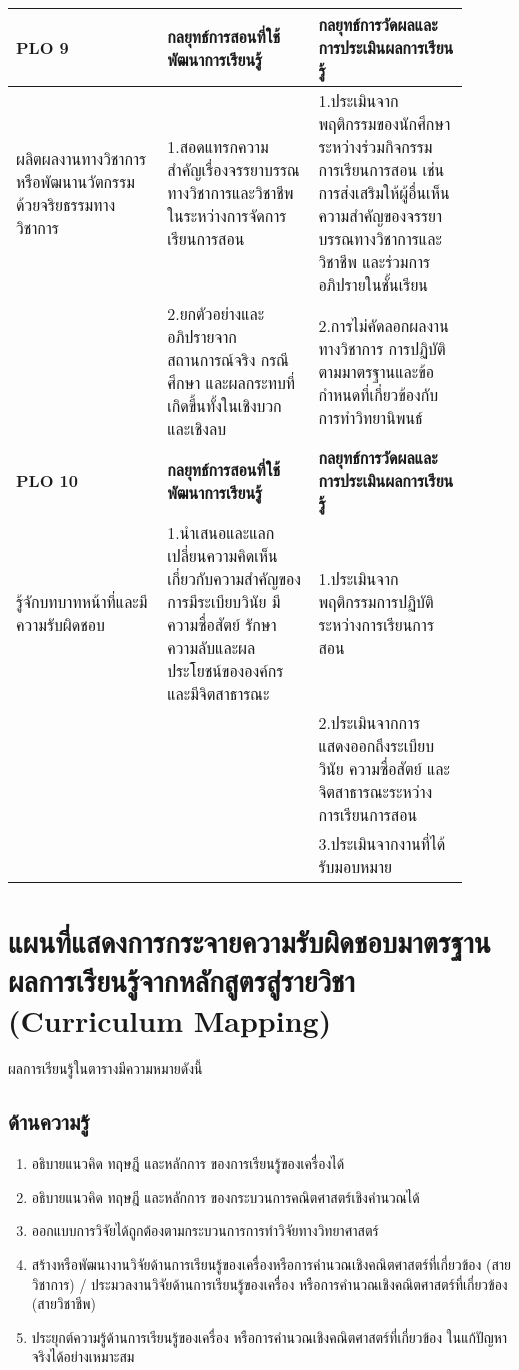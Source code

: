 \begin{landscape}
\begin{longtable}{|p{0.3\linewidth}|p{0.3\linewidth}|p{0.3\linewidth}|}
 \textbf{PLO 9} & \textbf{กลยุทธ์การสอนที่ใช้พัฒนาการเรียนรู้} & \textbf{กลยุทธ์การวัดผลและการประเมินผลการเรียนรู้} \\ 
 \hline
 ผลิตผลงานทางวิชาการ หรือพัฒนานวัตกรรม ด้วยจริยธรรมทางวิชาการ & 1.สอดแทรกความสำคัญเรื่องจรรยาบรรณทางวิชาการและวิชาชีพในระหว่างการจัดการเรียนการสอน & 1.ประเมินจากพฤติกรรมของนักศึกษาระหว่างร่วมกิจกรรมการเรียนการสอน เช่น การส่งเสริมให้ผู้อื่นเห็นความสำคัญของจรรยาบรรณทางวิชาการและวิชาชีพ และร่วมการอภิปรายในชั้นเรียน \\
 \hline
 & 2.ยกตัวอย่างและอภิปรายจากสถานการณ์จริง กรณีศึกษา และผลกระทบที่เกิดขึ้นทั้งในเชิงบวกและเชิงลบ & 2.การไม่คัดลอกผลงานทางวิชาการ การปฏิบัติตามมาตรฐานและข้อกำหนดที่เกี่ยวข้องกับการทำวิทยานิพนธ์ \\
 \hline

 \textbf{PLO 10} & \textbf{กลยุทธ์การสอนที่ใช้พัฒนาการเรียนรู้} & \textbf{กลยุทธ์การวัดผลและการประเมินผลการเรียนรู้} \\ 
 \hline
 รู้จักบทบาทหน้าที่และมีความรับผิดชอบ & 1.นำเสนอและแลกเปลี่ยนความคิดเห็นเกี่ยวกับความสำคัญของการมีระเบียบวินัย มีความซื่อสัตย์ รักษาความลับและผลประโยชน์ขององค์กร และมีจิตสาธารณะ & 1.ประเมินจากพฤติกรรมการปฏิบัติระหว่างการเรียนการสอน \\
 \hline
 && 2.ประเมินจากการแสดงออกถึงระเบียบวินัย ความซื่อสัตย์ และจิตสาธารณะระหว่างการเรียนการสอน \\
 \hline
 && 3.ประเมินจากงานที่ได้รับมอบหมาย \\
 \hline
 \end{longtable}
 \end{landscape}
 
 \section{แผนที่แสดงการกระจายความรับผิดชอบมาตรฐานผลการเรียนรู้จากหลักสูตรสู่รายวิชา (Curriculum Mapping)}
 ผลการเรียนรู้ในตารางมีความหมายดังนี้
\subsection{ด้านความรู้}
\begin{enumerate}
	\item อธิบายแนวคิด ทฤษฎี และหลักการ ของการเรียนรู้ของเครื่องได้
	\item อธิบายแนวคิด ทฤษฎี และหลักการ ของกระบวนการคณิตศาสตร์เชิงคำนวณได้
	\item ออกแบบการวิจัยได้ถูกต้องตามกระบวนการการทำวิจัยทางวิทยาศาสตร์
	\item สร้างหรือพัฒนางานวิจัยด้านการเรียนรู้ของเครื่องหรือการคำนวณเชิงคณิตศาสตร์ที่เกี่ยวข้อง (สายวิชาการ) / ประมวลงานวิจัยด้านการเรียนรู้ของเครื่อง หรือการคำนวณเชิงคณิตศาสตร์ที่เกี่ยวข้อง (สายวิชาชีพ)
	\item ประยุกต์ความรู้ด้านการเรียนรู้ของเครื่อง หรือการคำนวณเชิงคณิตศาสตร์ที่เกี่ยวข้อง ในแก้ปัญหาจริงได้อย่างเหมาะสม
\end{enumerate}
